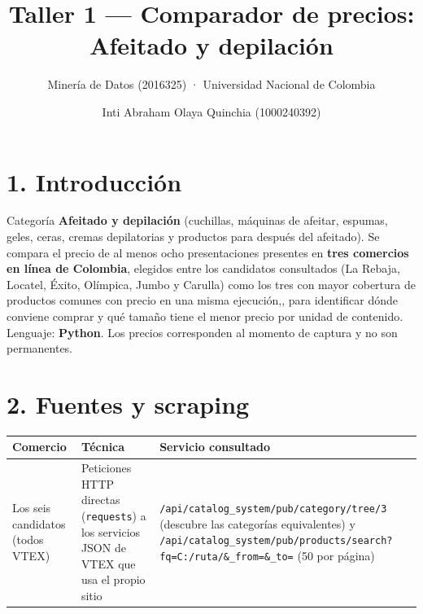 \documentclass[
  spanish,
  letterpaper,
  DIV=11,
  numbers=noendperiod]{scrartcl}
\title{Taller 1 --- Comparador de precios: Afeitado y depilación}
\subtitle{Minería de Datos (2016325) · Universidad Nacional de Colombia}
\author{Inti Abraham Olaya Quinchia (1000240392)}
\date{}
\newcounter{none} %
\renewcommand*\contentsname{Tabla de contenidos}
\newcommand\contentsname{Tabla de contenidos}
\begin{document}
\maketitle

\renewcommand*\contentsname{Tabla de contenidos}
{
\setcounter{tocdepth}{3}
\tableofcontents
}

\section{1. Introducción}\label{introducciuxf3n}

Categoría \textbf{Afeitado y depilación} (cuchillas, máquinas de
afeitar, espumas, geles, ceras, cremas depilatorias y productos para
después del afeitado). Se compara el precio de al menos ocho
presentaciones presentes en \textbf{tres comercios en línea de
Colombia}, elegidos entre los candidatos consultados (La Rebaja,
Locatel, Éxito, Olímpica, Jumbo y Carulla) como los tres con mayor
cobertura de productos comunes con precio en una misma ejecución,, para
identificar dónde conviene comprar y qué tamaño tiene el menor precio
por unidad de contenido. Lenguaje: \textbf{Python}. Los precios
corresponden al momento de captura y no son permanentes.

\section{2. Fuentes y scraping}\label{fuentes-y-scraping}

{\def\LTcaptype{none} %
\begin{longtable}[]{@{}
  >{\raggedright\arraybackslash}p{}
  >{\raggedright\arraybackslash}p{}
  >{\raggedright\arraybackslash}p{}@{}}
\toprule\noalign{}
\begin{minipage}[b]{\linewidth}\raggedright
Comercio
\end{minipage} & \begin{minipage}[b]{\linewidth}\raggedright
Técnica
\end{minipage} & \begin{minipage}[b]{\linewidth}\raggedright
Servicio consultado
\end{minipage} \\
\midrule\noalign{}
\endhead
\bottomrule\noalign{}
\endlastfoot
Los seis candidatos (todos VTEX) & Peticiones HTTP directas
(\texttt{requests}) a los servicios JSON de VTEX que usa el propio sitio
& \texttt{/api/catalog\_system/pub/category/tree/3} (descubre las
categorías equivalentes) y
\texttt{/api/catalog\_system/pub/products/search?fq=C:/ruta/\&\_from=\&\_to=}
(50 por página) \\
\end{longtable}
}
\end{document}
